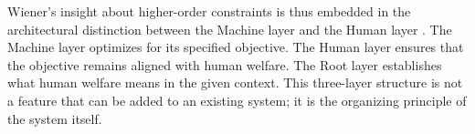 Wiener's insight about higher-order constraints is thus embedded in the architectural distinction between the Machine layer and the Human layer \cite{wiener1948}. The Machine layer optimizes for its specified objective. The Human layer ensures that the objective remains aligned with human welfare. The Root layer establishes what human welfare means in the given context. This three-layer structure is not a feature that can be added to an existing system; it is the organizing principle of the system itself.
